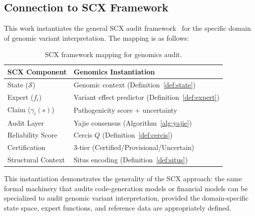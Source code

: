\documentclass[11pt,a4paper]{article}
\theoremstyle{definition}
\newcommand{\calS}{\mathcal{S}}
\newcommand{\SCX}{\textsc{SCX}}
\begin{document}
\subsection{Connection to SCX Framework}
This work instantiates the general \SCX{} audit framework~\cite{scxframework} for the specific domain of genomic variant interpretation.
The mapping is as follows:
\begin{table}[ht]
\centering
\caption{\SCX{} framework mapping for genomics audit.}
\label{tab:scx-mapping}
\begin{tabular}{@{}ll@{}}
\toprule
\textbf{SCX Component} & \textbf{Genomics Instantiation} \\
\midrule
State ($\calS$) & Genomic context (Definition~\ref{def:state}) \\
Expert ($f_i$) & Variant effect predictor (Definition~\ref{def:expert}) \\
Claim ($\gamma_i(s)$) & Pathogenicity score + uncertainty \\
Audit Layer & Yajie consensus (Algorithm~\ref{alg:yajie}) \\
Reliability Score & Cercis $Q$ (Definition~\ref{def:cercis}) \\
Certification & 3-tier (Certified/Provisional/Uncertain) \\
Structural Context & Situs encoding (Definition~\ref{def:situs}) \\
\bottomrule
\end{tabular}
\end{table}
This instantiation demonstrates the generality of the \SCX{} approach: the same formal machinery that audits code-generation models or financial models can be specialized to audit genomic variant interpretation, provided the domain-specific state space, expert functions, and reference data are appropriately defined.
\end{document}
